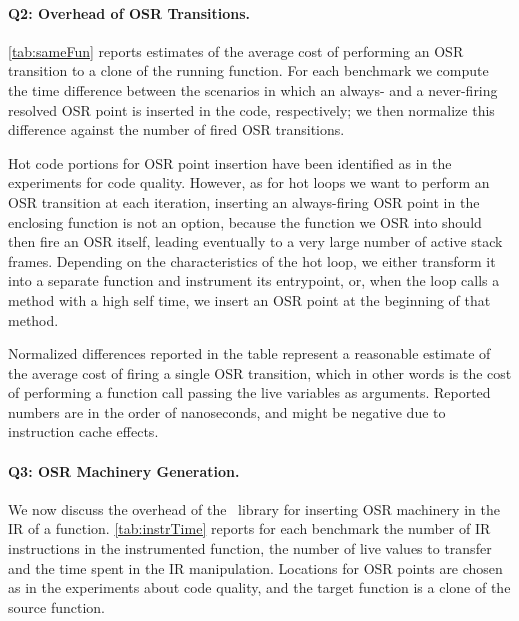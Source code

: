 \begin{description}
\paragraph{Q2: Overhead of OSR Transitions.}

\mytable\ref{tab:sameFun} reports estimates of the average cost of performing an OSR transition to a clone of the running function. For each benchmark we compute the time difference between the scenarios in which an always- and a never-firing resolved OSR point is inserted in the code, respectively; we then normalize this difference against the number of fired OSR transitions.

Hot code portions for OSR point insertion have been identified as in the experiments for code quality. However, as for hot loops we want to perform an OSR transition at each iteration, inserting an always-firing OSR point in the enclosing function is not an option, because the function we OSR into should then fire an OSR itself, leading eventually to a very large number of active stack frames. Depending on the characteristics of the hot loop, we either transform it into a separate function and instrument its entrypoint, or, when the loop calls a method with a high self time, we insert an OSR point at the beginning of that method.

Normalized differences reported in the table represent a reasonable estimate of the average cost of firing a single OSR transition, which in other words is the cost of performing a function call passing the live variables as arguments. Reported numbers are in the order of nanoseconds, and might be negative due to instruction cache effects.

\paragraph{Q3: OSR Machinery Generation.}
We now discuss the overhead of the \osrkit\ library for inserting OSR machinery in the IR of a function. \mytable\ref{tab:instrTime} reports for each benchmark the number of IR instructions in the instrumented function, the number of live values to transfer and the time spent in the IR manipulation. Locations for OSR points are chosen as in the experiments about code quality, and the target function is a clone of the source function.


\end{description}
